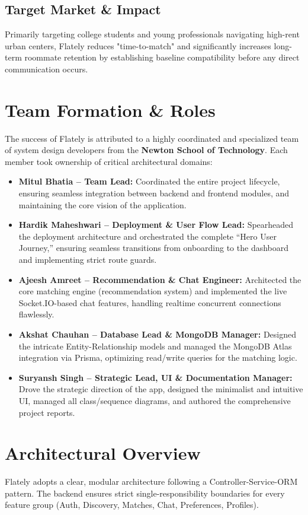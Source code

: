 \documentclass[12pt,a4paper]{article}
\begin{document}
\subsection{Target Market \& Impact}
Primarily targeting college students and young professionals navigating high-rent urban centers, Flately reduces "time-to-match" and significantly increases long-term roommate retention by establishing baseline compatibility before any direct communication occurs.

\section{Team Formation \& Roles}
The success of Flately is attributed to a highly coordinated and specialized team of system design developers from the \textbf{Newton School of Technology}. Each member took ownership of critical architectural domains:

\begin{itemize}[leftmargin=*]
    \item \textbf{Mitul Bhatia -- Team Lead:} Coordinated the entire project lifecycle, ensuring seamless integration between backend and frontend modules, and maintaining the core vision of the application.
    \item \textbf{Hardik Maheshwari -- Deployment \& User Flow Lead:} Spearheaded the deployment architecture and orchestrated the complete ``Hero User Journey,'' ensuring seamless transitions from onboarding to the dashboard and implementing strict route guards.
    \item \textbf{Ajeesh Amreet -- Recommendation \& Chat Engineer:} Architected the core matching engine (recommendation system) and implemented the live Socket.IO-based chat features, handling realtime concurrent connections flawlessly.
    \item \textbf{Akshat Chauhan -- Database Lead \& MongoDB Manager:} Designed the intricate Entity-Relationship models and managed the MongoDB Atlas integration via Prisma, optimizing read/write queries for the matching logic.
    \item \textbf{Suryansh Singh -- Strategic Lead, UI \& Documentation Manager:} Drove the strategic direction of the app, designed the minimalist and intuitive UI, managed all class/sequence diagrams, and authored the comprehensive project reports.
\end{itemize}

\section{Architectural Overview}
Flately adopts a clear, modular architecture following a Controller-Service-ORM pattern. The backend ensures strict single-responsibility boundaries for every feature group (Auth, Discovery, Matches, Chat, Preferences, Profiles).
\end{document}

